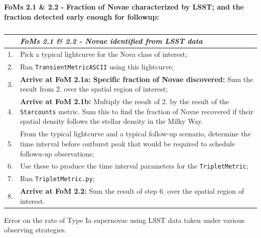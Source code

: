 {\bf FoMs 2.1 \& 2.2 - Fraction of Novae characterized by LSST; and the fraction detected early enough for followup:} 


\begin{table}[h]
  \small
  \begin{tabular}{c p{12cm}}
    & {\it FoMs 2.1 \& 2.2 - Novae identified from LSST data} \\
    \hline
  1. & Pick a typical lightcurve for the Nova class of interest; \\
  2. & Run {\tt TransientMetricASCII} using this lightcurve; \\
  3. & {\bf Arrive at FoM 2.1a: Specific fraction of Novae discovered:} Sum the result from 2. over the spatial region of interest; \\
  4. & {\bf Arrive at FoM 2.1b:} Multiply the result of 2. by the result of the {\tt Starcounts} metric. Sum this to find the fraction of Novae recovered if their spatial density follows the stellar density in the Milky Way. \\
  \hline
  5. & From the typical lightcurve and a typical follow-up scenario, determine the time interval before outburst peak that would be required to schedule followu-up observations;\\
  6. & Use these to produce the time interval parameters for the {\tt TripletMetric}; \\
  7. & Run {\tt TripletMetric.py}; \\
  8. & {\bf Arrive at FoM 2.2:} Sum the result of step 6. over the spatial region of interest.\\
\hline
    \end{tabular}
 \caption{}
  \label{table:pseudoFOM_2p1}
\end{table}


 Error on the rate of Type Ia
supernovae using LSST data taken under various observing strategies.

